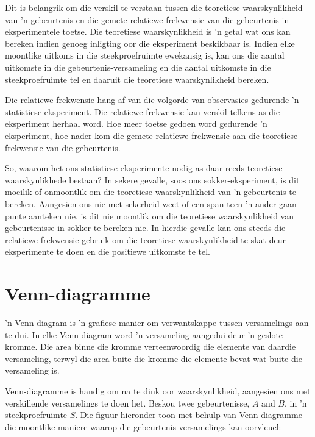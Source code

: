 Dit is belangrik om die verskil te verstaan tussen die teoretiese waarskynlikheid van 'n gebeurtenis en die gemete relatiewe frekwensie van die gebeurtenis in eksperimentele toetse. Die teoretiese waarskynlikheid is 'n getal wat ons kan bereken indien genoeg inligting oor die eksperiment beskikbaar is. Indien elke moontlike uitkoms in die steekproefruimte ewekansig is, kan ons die aantal uitkomste in die gebeurtenis-versameling en die aantal uitkomste in die steekproefruimte tel en daaruit die teoretiese waarskynlikheid bereken.\par

Die relatiewe frekwensie hang af van die volgorde van observasies gedurende 'n statistiese eksperiment. Die relatiewe frekwensie kan verskil telkens as die eksperiment herhaal word. Hoe meer toetse gedoen word gedurende 'n eksperiment, hoe nader kom die gemete relatiewe frekwensie aan die teoretiese frekwensie van die gebeurtenis.\par

So, waarom het ons statistiese eksperimente nodig as daar reeds teoretiese waarskynlikhede bestaan? In sekere gevalle, soos ons sokker-eksperiment, is dit moeilik of onmoontlik om die teoretiese waarskynlikheid van 'n gebeurtenis te bereken. Aangesien ons nie met sekerheid weet of een span teen 'n ander gaan punte aanteken nie, is dit nie moontlik om die teoretiese waarskynlikheid van gebeurtenisse in sokker te bereken nie. In hierdie gevalle kan ons steeds die relatiewe frekwensie gebruik om die teoretiese waarskynlikheid te skat deur eksperimente te doen en die positiewe uitkomste te tel.

\section{Venn-diagramme}
'n Venn-diagram is 'n grafiese manier om verwantskappe tussen versamelings aan te dui. In elke Venn-diagram word 'n versameling aangedui deur 'n geslote kromme. Die area binne die kromme verteenwoordig die elemente van daardie versameling, terwyl die area buite die kromme die elemente bevat wat buite die versameling is.
\par


Venn-diagramme is handig om na te dink oor waarskynlikheid, aangesien ons met verskillende versamelings te doen het. Beskou twee gebeurtenisse, $A$ and $B$, in 'n steekproefruimte $S$. Die figuur hieronder toon met behulp van Venn-diagramme die moontlike maniere waarop die gebeurtenis-versamelings kan oorvleuel:


